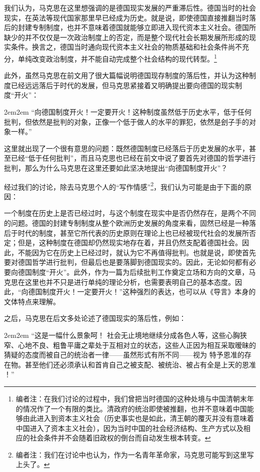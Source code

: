 \documentclass[a4paper,twoside,12pt,AutoFakeBold]{ctexart}
\begin{document}
我们认为，马克思在这里想强调的是德国现实发展的严重滞后性。德国当时的社会现实，在英法等现代国家那里早已经成为历史。就是说，即使德国直接推翻当时落后的封建专制制度，也并不意味着德国就能够立即进入现代资本主义社会。德国所缺少的并不仅仅是一次政治制度上的否定，而是整个现代社会长期发展所形成的现实条件。换言之，德国当时通向现代资本主义社会的物质基础和社会条件尚不充分，单纯改变政治制度，并不能自动完成整个社会结构的现代转型。\footnote{编者注：在我们讨论的过程中，我们曾把当时德国的这种处境与中国清朝末年的情况作了一个有限的类比。清政府的统治即使被推翻，也并不意味着中国能够由此进入到资本主义社会（历史事实也是如此，清王朝的覆灭并没有意味着中国进入了资本主义社会），因为当时中国的社会经济结构、生产方式以及相应的社会条件并不会随着旧政权的倒台而自动发生根本转变。}

\vspace{1em}
此外，虽然马克思在前文用了很大篇幅说明德国现存制度的落后性，并认为这种制度已经远远落后于时代的发展，但马克思紧接着又明确提出要向德国的现实制度“开火”：
\begin{adjustwidth}{2em}{2em}
\qquad\fangsong
“向德国制度开火！一定要开火！这种制度虽然低于历史水平，低于任何批判，但依然是批判的对象，正像一个低于做人的水平的罪犯，依然是刽子手的对象一样。”
\end{adjustwidth}

这里就出现了一个很有意思的问题：既然德国制度已经落后于历史发展的水平，甚至已经“低于任何批判”，而且马克思也已经在前文中说了要首先对德国的哲学进行批判，那么为什么马克思在这里还要如此坚决地提出“向德国制度开火”？

经过我们的讨论，除去马克思个人的“写作情感”\footnote{编者注：我们在讨论中也认为，作为一名青年革命家，马克思可能写到这里写上头了。}，我们认为可能是由于下面的原因：

一个制度在历史上是否已经过时，与这个制度在现实中是否仍然存在，是两个不同的问题。德国的封建专制制度从整个欧洲历史发展的角度来看，固然已经是一种落后于时代的制度，甚至它所代表的历史原则在理论上也已经被现代社会的发展所否定；但是，这种制度在德国却仍然现实地存在着，并且仍然支配着德国社会。因此，不能因为它在历史上已经过时，就认为它不再值得批判。也就是说，即使首先要对德国哲学进行批判，但最后也是要落脚到德国现实的。因此，无论如何都有必要向德国制度“开火”。此外，作为一篇为后续批判工作奠定立场和方向的文章，马克思在这里也并不只是进行单纯的理论分析，也需要表明自己的基本态度。因此，“向德国制度开火！一定要开火！”这种强烈的表达，也可以从《导言》本身的文体特点来理解。

\vspace{1em}
之后，马克思在后文多处论述了德国现实的落后性，例如：
\begin{adjustwidth}{2em}{2em}
\qquad\fangsong
“这是一幅什么景象呵！ 社会无止境地继续分成各色人等，这些心胸狭窄、心地不良、粗鲁平庸之辈处于互相对立的状态，这些人正因为相互采取暧昧的猜疑的态度而被自己的统治者一律——虽然形式有所不同——视为 特予恩准的存在物。甚至他们还必须承认和首肯自己之被支配、被统治、被占有全是上天的恩准 ！”
\end{adjustwidth}
\end{document}
